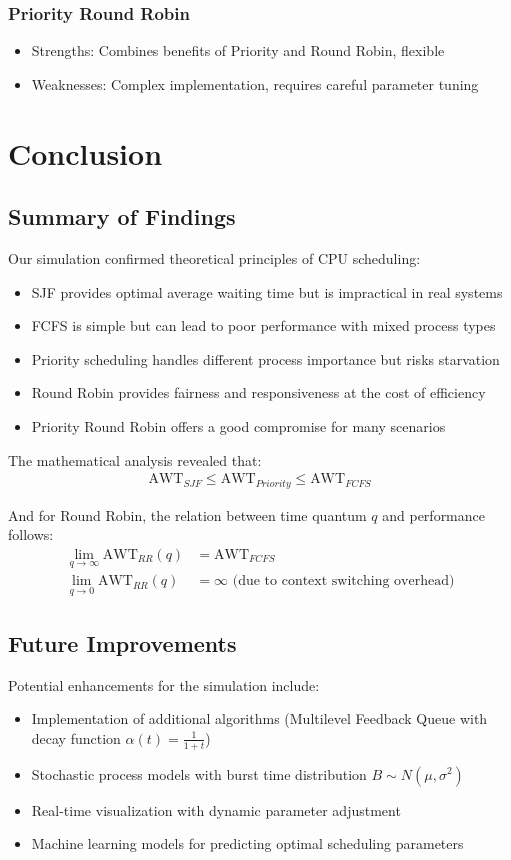 \documentclass[12pt,a4paper]{report}
\begin{document}
\subsection{Priority Round Robin}
\begin{itemize}
    \item Strengths: Combines benefits of Priority and Round Robin, flexible
    \item Weaknesses: Complex implementation, requires careful parameter tuning
\end{itemize}

\chapter{Conclusion}
\section{Summary of Findings}
Our simulation confirmed theoretical principles of CPU scheduling:
\begin{itemize}
    \item SJF provides optimal average waiting time but is impractical in real systems
    \item FCFS is simple but can lead to poor performance with mixed process types
    \item Priority scheduling handles different process importance but risks starvation
    \item Round Robin provides fairness and responsiveness at the cost of efficiency
    \item Priority Round Robin offers a good compromise for many scenarios
\end{itemize}

The mathematical analysis revealed that:
\begin{align}
\text{AWT}_{SJF} \leq \text{AWT}_{Priority} \leq \text{AWT}_{FCFS}
\end{align}

And for Round Robin, the relation between time quantum $q$ and performance follows:
\begin{align}
\lim_{q \to \infty} \text{AWT}_{RR}(q) &= \text{AWT}_{FCFS}\\
\lim_{q \to 0} \text{AWT}_{RR}(q) &= \infty \text{ (due to context switching overhead)}
\end{align}

\section{Future Improvements}
Potential enhancements for the simulation include:
\begin{itemize}
    \item Implementation of additional algorithms (Multilevel Feedback Queue with decay function $\alpha(t) = \frac{1}{1+t}$)
    \item Stochastic process models with burst time distribution $B \sim N(\mu, \sigma^2)$
    \item Real-time visualization with dynamic parameter adjustment
    \item Machine learning models for predicting optimal scheduling parameters
\end{itemize}
\end{document}
